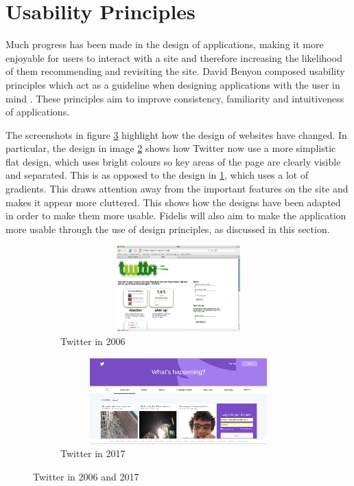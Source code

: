 \section{Usability Principles}
Much progress has been made in the design of applications, making it more enjoyable for users to interact with a site and therefore increasing the likelihood of them recommending and revisiting the site. David Benyon composed usability principles which act as a guideline when designing applications with the user in mind \cite{Benyon}. These principles aim to improve consistency, familiarity and intuitiveness of applications.

The screenshots in figure \ref{fig:Twitter_Changes} highlight how the design of websites have changed. In particular, the design in image \ref{fig:Twitter_2017} shows how Twitter now use a more simplistic flat design, which uses bright colours so key areas of the page are clearly visible and separated. This is as opposed to the design in \ref{fig:Twitter_2006}, which uses a lot of gradients. This draws attention away from the important features on the site and makes it appear more cluttered. This shows how the designs have been adapted in order to make them more usable. Fidelis will also aim to make the application more usable through the use of design principles, as discussed in this section.

\begin{figure}[H]
	\centering
	\begin{subfigure}[t]{0.45\textwidth}
		\centering
		\includegraphics[width=1.0\textwidth, height=125px]{Images/Design/Twitter_2006}
		\caption{Twitter in 2006}\label{fig:Twitter_2006}		
	\end{subfigure}
	\quad
	\begin{subfigure}[t]{0.45\textwidth}
		\centering
		\includegraphics[width=1.0\textwidth, height=125px]{Images/Design/Twitter_2017}
		\caption{Twitter in 2017}\label{fig:Twitter_2017}
	\end{subfigure}
	\caption{Twitter in 2006 and 2017}\label{fig:Twitter_Changes}
\end{figure}

